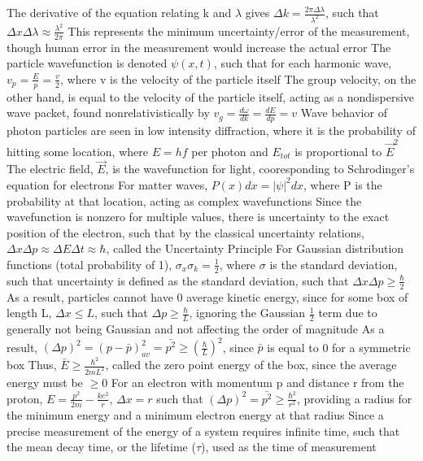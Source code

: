 \documentclass[11 pt, twoside]{article}
\newenvironment{outline*}
{
	\begin{outline}[enumerate]
	}
	{\end{outline}
}
\begin{document}
\begin{outline*}
		\3 The derivative of the equation relating k and $\lambda$ gives $\Delta k = \frac{2\pi \Delta \lambda}{\lambda^2}$, such that $\Delta x \Delta \lambda \approx \frac{\lambda^2}{2\pi}$
		\3 This represents the minimum uncertainty/error of the measurement, though human error in the measurement would increase the actual error
	\2 The particle wavefunction is denoted $\psi(x, t)$, such that for each harmonic wave, $v_p = \frac{E}{p} = \frac{v}{2}$, where v is the velocity of the particle itself
		\3 The group velocity, on the other hand, is equal to the velocity of the particle itself, acting as a nondispersive wave packet, found nonrelativistically by $v_g = \frac{d\omega}{dk} = \frac{dE}{dp} = v$
	\2 Wave behavior of photon particles are seen in low intensity diffraction, where it is the probability of hitting some location, where $E = hf$ per photon and $E_{tot}$ is proportional to $\vec{E}^2$
		\3 The electric field, $\vec{E}$, is the wavefunction for light, cooresponding to Schrodinger's equation for electrons
		\3 For matter waves, $P(x)dx = |\psi|^2dx$, where P is the probability at that location, acting as complex wavefunctions
\1 Since the wavefunction is nonzero for multiple values, there is uncertainty to the exact position of the electron, such that by the classical uncertainty relations, $\Delta x \Delta p \approx \Delta E \Delta t \approx \hbar$, called the Uncertainty Principle
	\2 For Gaussian distribution functions (total probability of 1), $\sigma_x \sigma_k = \frac{1}{2}$, where $\sigma$ is the standard deviation, such that uncertainty is defined as the standard deviation, such that $\Delta x \Delta p \geq \frac{\hbar}{2}$
	\2 As a result, particles cannot have 0 average kinetic energy, since for some box of length L, $\Delta x \leq L$, such that $\Delta p \geq \frac{\hbar}{L}$, ignoring the Gaussian $\frac{1}{2}$ term due to generally not being Gaussian and not affecting the order of magnitude
		\3 As a result, $(\Delta p)^2 = (p - \bar{p})^2_{av} = \bar{p^2} \geq (\frac{\hbar}{L})^2$, since $\bar{p}$ is equal to 0 for a symmetric box
		\3 Thus, $\bar{E} \geq \frac{\hbar^2}{2mL^2}$, called the zero point energy of the box, since the average energy must be $\geq 0$
	\2 For an electron with momentum p and distance r from the proton, $E = \frac{p^2}{2m} - \frac{ke^2}{r}$, $\Delta x = r$ such that $(\Delta p)^2 = \bar{p^2} \geq \frac{\hbar^2}{r^2}$, providing a radius for the minimum energy and a minimum electron energy at that radius
	\2 Since a precise measurement of the energy of a system requires infinite time, such that the mean decay time, or the lifetime ($\tau$), used as the time of measurement

\end{outline*}
\end{document}
